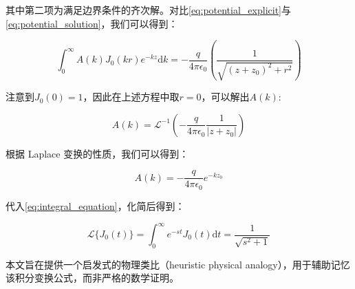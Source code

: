 \documentclass[11pt,a4paper]{ctexart}
\newcommand{\dd}{\mathrm{d}}
\begin{document}
其中第二项为满足边界条件的齐次解。对比\eqref{eq:potential_explicit}与\eqref{eq:potential_solution}，我们可以得到：

\begin{equation}
    \int_{0}^{\infty}A(k)J_0(kr)e^{-kz}\dd{k} = -\frac{q}{4\pi\epsilon_0}\left(\frac{1}{\sqrt{(z+z_0)^2 + r^2}}\right)
    \label{eq:integral_equation}
\end{equation}

注意到$J_0(0)=1$，因此在上述方程中取$r=0$，可以解出$A(k)$:

\begin{equation}
    A(k) = \mathcal{L}^{-1}\left(-\frac{q}{4\pi\epsilon_0} \frac{1}{\left|z+z_0\right|}\right)
\end{equation}

根据 Laplace 变换的性质，我们可以得到：

\begin{equation}
    A(k)= -\frac{q}{4\pi\epsilon_0} e^{-kz_0}
\end{equation}

代入\eqref{eq:integral_equation}，化简后得到：

\begin{equation}
    \mathcal{L}\{J_0(t)\} = \int_0^\infty e^{-st} J_0(t) \dd{t} = \frac{1}{\sqrt{s^2 + 1}}
\end{equation}

本文旨在提供一个启发式的物理类比（heuristic physical analogy），用于辅助记忆该积分变换公式，而非严格的数学证明。
\end{document}
